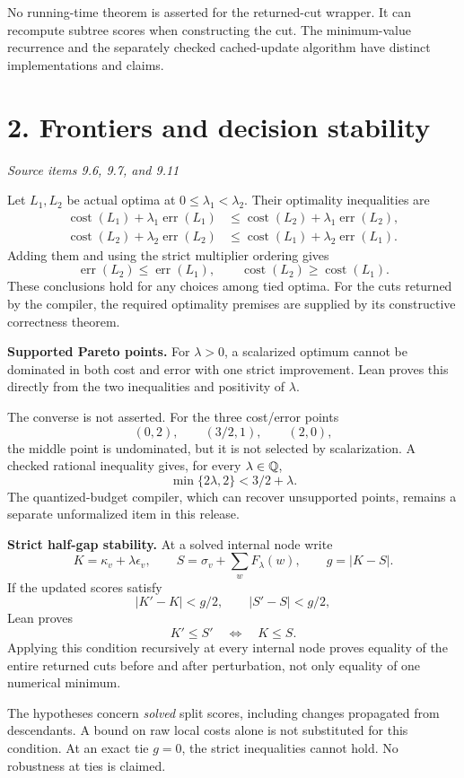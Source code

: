 \documentclass[11pt]{article}
\newcommand{\cost}{\operatorname{cost}}\newcommand{\err}{\operatorname{err}}
\newcommand{\pageheading}[2]{\section*{\color{ink}#1}\textit{#2}\par}
\begin{document}
No running-time theorem is asserted for the returned-cut wrapper. It can recompute subtree scores when constructing the cut. The minimum-value recurrence and the separately checked cached-update algorithm have distinct implementations and claims.

\newpage
\pageheading{2. Frontiers and decision stability}{Source items 9.6, 9.7, and 9.11}
Let $L_1,L_2$ be actual optima at $0\leq\lambda_1<\lambda_2$. Their optimality inequalities are
\begin{align*}
\cost(L_1)+\lambda_1\err(L_1)&\leq\cost(L_2)+\lambda_1\err(L_2),\\
\cost(L_2)+\lambda_2\err(L_2)&\leq\cost(L_1)+\lambda_2\err(L_1).
\end{align*}
Adding them and using the strict multiplier ordering gives
\[
\boxed{\err(L_2)\leq\err(L_1),\qquad \cost(L_2)\geq\cost(L_1).}
\]
These conclusions hold for any choices among tied optima. For the cuts returned by the compiler, the required optimality premises are supplied by its constructive correctness theorem.

\textbf{Supported Pareto points.} For $\lambda>0$, a scalarized optimum cannot be dominated in both cost and error with one strict improvement. Lean proves this directly from the two inequalities and positivity of $\lambda$.

The converse is not asserted. For the three cost/error points
\[
(0,2),\qquad (3/2,1),\qquad (2,0),
\]
the middle point is undominated, but it is not selected by scalarization. A checked rational inequality gives, for every $\lambda\in\mathbb Q$,
\[
\min\{2\lambda,2\}<3/2+\lambda.
\]
The quantized-budget compiler, which can recover unsupported points, remains a separate unformalized item in this release.

\textbf{Strict half-gap stability.} At a solved internal node write
\[
K=\kappa_v+\lambda\epsilon_v,\qquad
S=\sigma_v+\sum_wF_\lambda(w),\qquad g=|K-S|.
\]
If the updated scores satisfy
\[
|K'-K|<g/2,\qquad |S'-S|<g/2,
\]
Lean proves
\[
K'\leq S'\quad\Longleftrightarrow\quad K\leq S.
\]
Applying this condition recursively at every internal node proves equality of the entire returned cuts before and after perturbation, not only equality of one numerical minimum.

The hypotheses concern \emph{solved} split scores, including changes propagated from descendants. A bound on raw local costs alone is not substituted for this condition. At an exact tie $g=0$, the strict inequalities cannot hold. No robustness at ties is claimed.
\end{document}
